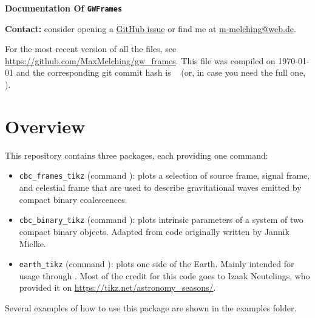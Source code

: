 \documentclass[
    DIV=11,
    BCOR=0mm,
    paper=a4,
    fontsize=11pt,
    twoside=false,
    titlepage=true
]{scrartcl}
\newcommand{\code}[1]{\textcolor{codecolor}{\texttt{#1}}}
\newcommand{\gitrevision}{%
  \StrLeft{\HEAD}{7}%
}
\begin{document}
{\noindent\rmfamily\Huge\bfseries
    Documentation Of \code{GWFrames}
}

\begin{center}
    \textbf{Contact:} consider opening a \href{https://github.com/MaxMelching/minkowski_diagram/issues}{GitHub issue} or find me at \href{mailto:m-melching@web.de}{m-melching@web.de}.
\end{center}


For the most recent version of all the files, see \url{https://github.com/MaxMelching/gw_frames}.
This file was compiled on \today{} and the corresponding git commit hash
is \code{\gitrevision{}} (or, in case you need the full one, \code{\HEAD{}}\hspace{-0.5em}).



    \section{Overview}

This repository contains three packages, each providing one command:
\begin{itemize}
    \item \code{cbc\_frames\_tikz} (command \code{\string\drawframes}): plots a
    selection of source frame, signal frame, and celestial frame that are
    used to describe gravitational waves emitted by compact binary coalescences.
    
    
    \item \code{cbc\_binary\_tikz} (command \code{\string\drawbinary}): plots
    intrinsic parameters of a system of two compact binary objects. Adapted
    from code originally written by Jannik Mielke.
    
    
    \item \code{earth\_tikz} (command \code{\string\drawearth}): plots one side of
    the Earth. Mainly intended for usage through \code{\string\drawframes}. Most of
    the credit for this code goes to Izaak Neutelings, who provided it on
    \url{https://tikz.net/astronomy_seasons/}.
\end{itemize}

Several examples of how to use this package are shown in the examples folder.


\end{document}
